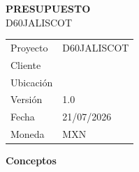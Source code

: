 \documentclass[11pt,a4paper]{article}
\begin{document}
\begin{center}
  {\Huge\color{Principal}\textbf{PRESUPUESTO}}\\[2mm]
  {\Large D60JALISCOT}
\end{center}

\vspace{5mm}

\begin{tabularx}{\textwidth}{@{} l X @{}}
  Proyecto    & D60JALISCOT\\
  Cliente     & \\
  Ubicaci\'on & \\
  Versi\'on   & 1.0\\
  Fecha       & 21/07/2026\\
  Moneda      & MXN\\
\end{tabularx}

\vspace{8mm}

{\Large\textbf{Conceptos}}
\end{document}
